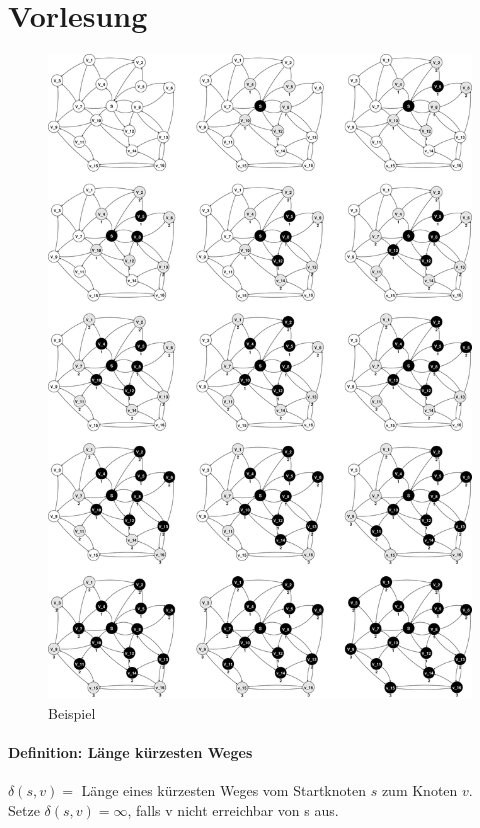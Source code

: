 \setlength{\headheight}{-50pt}
\chapter{Vorlesung}
\vspace{-40pt}
\begin{figure}[H]
\centering
\includegraphics[width=0.9\linewidth]{16/Grafik/Diagramm}
\caption{Beispiel}
\label{fig:Diagramm}
\vspace{-80pt}
\end{figure}
\clearpage
\setlength{\headheight}{0pt}
\subsubsection{Definition: Länge kürzesten Weges}
$\delta(s,v)=$ Länge eines kürzesten Weges vom Startknoten $s$ zum Knoten $v$.\\
Setze $\delta(s,v)=\infty$, falls v nicht erreichbar von s aus.
